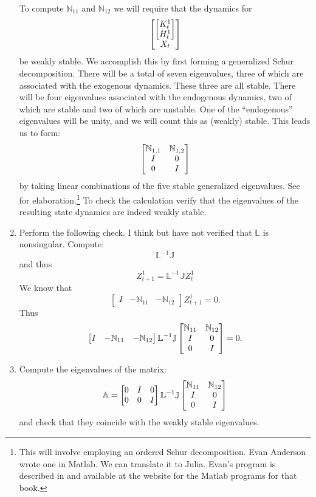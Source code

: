 \documentclass[12pt]{article}
\begin{document}
\begin{enumerate}
To compute $ {\mathbb N}_{11}$ and $ {\mathbb N}_{12}$ we will require that the dynamics for
\[
\begin{bmatrix} \begin{bmatrix} K_{t}^1 \cr H_{t}^1 \end{bmatrix} \cr X_t \end{bmatrix}
\]
be weakly stable.  %
We accomplish this by first forming a generalized Schur decomposition.  There will be a total of seven eigenvalues, three of which are associated with the exogenous dynamics.  These three are all stable.  There will be four eigenvalues associated with the endogenous dynamics, two of which are  stable  and two of which are unstable.  One of the ``endogenous''  eigenvalues will be unity, and we will count this as (weakly) stable.
This leads us to form:
\[
\begin{bmatrix} {\mathbb N}_{1,1} & {\mathbb N}_{1,2} \cr I  & 0 \cr 0 & I  \end{bmatrix}
\]
by taking linear combinations of the five stable generalized eigenvalues.  See \citet[ch.~4]{HSrobustnessmonograph} for  elaboration.\footnote{This will involve employing an ordered Schur decomposition. Evan Anderson wrote one in Matlab.  We can translate it to Julia.  Evan's program is described in \citet[ch.~4]{HSrobustnessmonograph} and available at the website for the Matlab programs for that book.}  To check the calculation verify that the eigenvalues of the resulting state dynamics are indeed weakly stable.

\item Perform the following check.  I think but have not verified that ${\mathbb L}$ is nonsingular.  Compute:
\[
 {\mathbb L}^{-1} {\mathbb J}
\]
and thus
\[
Z_{t+1}^1 = {\mathbb L}^{-1} {\mathbb J} Z_t^1
\]
We know that
\[
\begin{bmatrix} I & -{\mathbb N}_{11} & -  {\mathbb N}_{12}  \end{bmatrix} Z_{t+1}^1 =  0.
\]
Thus
\[
\begin{bmatrix} I &  -{\mathbb N}_{11} & -  {\mathbb N}_{12}  \end{bmatrix}  {\mathbb L}^{-1} {\mathbb J}
\begin{bmatrix} {\mathbb N}_{11} & {\mathbb N}_{12} \cr I & 0 \cr 0 & I  \end{bmatrix}  = 0.
\]

\item Compute the eigenvalues of the matrix:
\[
{\mathbb A} = \begin{bmatrix} 0 & I  & 0  \cr
0 & 0 & I
\end{bmatrix}  {\mathbb L}^{-1} {\mathbb J}
\begin{bmatrix} {\mathbb N}_{11}  & {\mathbb N}_{12} \cr I & 0 \cr 0 & I  \end{bmatrix}
\]
and check that they coincide with the weakly stable eigenvalues.


\end{enumerate}
\end{document}
